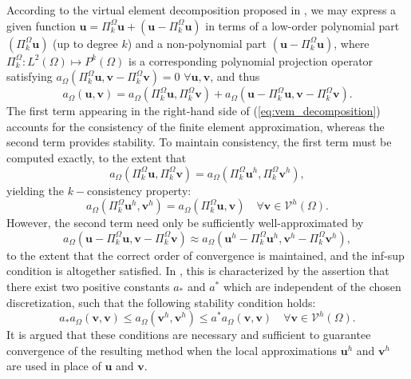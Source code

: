 	According to the virtual element decomposition proposed in \cite{Veiga:13}, we may express a given function $\mathbf{u} = \Pi^{\Omega}_k \mathbf{u} + (\mathbf{u} - \Pi^{\Omega}_k \mathbf{u})$ in terms of a low-order polynomial part $(\Pi^{\Omega}_k \mathbf{u})$ (up to degree $k$) and a non-polynomial part $(\mathbf{u} - \Pi^{\Omega}_k \mathbf{u})$, where $\Pi^{\Omega}_k : L^2 (\Omega) \mapsto P^k (\Omega)$ is a corresponding polynomial projection operator satisfying $a_{\Omega}(\Pi^{\Omega}_k \mathbf{u},\mathbf{v} - \Pi^{\Omega}_k \mathbf{v}) = 0 \, \, \forall \mathbf{u}, \mathbf{v}$, and thus
	\begin{equation}
		a_{\Omega}(\mathbf{u},\mathbf{v}) = a_{\Omega}(\Pi^{\Omega}_k \mathbf{u},\Pi^{\Omega}_k \mathbf{v}) + a_{\Omega}(\mathbf{u} - \Pi^{\Omega}_k \mathbf{u},\mathbf{v} - \Pi^{\Omega}_k \mathbf{v}).
		\label{eq:vem_decomposition}
	\end{equation}
	The first term appearing in the right-hand side of (\ref{eq:vem_decomposition}) accounts for the consistency of the finite element approximation, whereas the second term provides stability. To maintain consistency, the first term must be computed exactly, to the extent that
	\begin{equation}
		a_{\Omega}(\Pi^{\Omega}_k \mathbf{u},\Pi^{\Omega}_k \mathbf{v}) = a_{\Omega}(\Pi^{\Omega}_k \mathbf{u}^h,\Pi^{\Omega}_k \mathbf{v}^h),
	\end{equation}	
	yielding the $k-$consistency property:
	\begin{equation}
		a_{\Omega}(\Pi^{\Omega}_k \mathbf{u}^h,\mathbf{v}^h) = a_{\Omega}(\Pi^{\Omega}_k \mathbf{u},\mathbf{v}) \quad \forall \mathbf{v} \in \mathcal{V}^h (\Omega).
	\end{equation}
	However, the second term need only be sufficiently well-approximated by
	\begin{equation}
		a_{\Omega}(\mathbf{u} - \Pi^{\Omega}_k \mathbf{u},\mathbf{v} - \Pi^{\Omega}_k \mathbf{v}) \approx a_{\Omega}(\mathbf{u}^h - \Pi^{\Omega}_k \mathbf{u}^h,\mathbf{v}^h - \Pi^{\Omega}_k \mathbf{v}^h),
	\end{equation}
	to the extent that the correct order of convergence is maintained, and the inf-sup condition is altogether satisfied. In \cite{Veiga:13}, this is characterized by the assertion that there exist two positive constants $a_*$ and $a^*$ which are independent of the chosen discretization, such that the following stability condition holds:
	\begin{equation}
			a_* a_{\Omega} (\mathbf{v},\mathbf{v}) \leq a_{\Omega} (\mathbf{v}^h,\mathbf{v}^h) \leq a^* a_{\Omega} (\mathbf{v},\mathbf{v}) \quad \forall \mathbf{v} \in \mathcal{V}^h (\Omega).
	\end{equation}
	It is argued that these conditions are necessary and sufficient to guarantee convergence of the resulting method when the local approximations $\mathbf{u}^h$ and $\mathbf{v}^h$ are used in place of $\mathbf{u}$ and $\mathbf{v}$.
	
